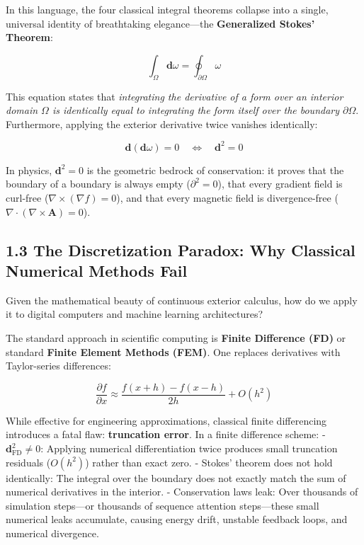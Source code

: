 \documentclass[11pt,twoside,openright]{amsbook}
\begin{document}
In this language, the four classical integral theorems collapse into a single, universal identity of breathtaking elegance—the \textbf{Generalized Stokes' Theorem}:

$$\int_\Omega \mathbf{d}\omega = \oint_{\partial \Omega} \omega$$

This equation states that \textit{integrating the derivative of a form over an interior domain $\Omega$ is identically equal to integrating the form itself over the boundary $\partial \Omega$}. Furthermore, applying the exterior derivative twice vanishes identically:

$$\mathbf{d}(\mathbf{d}\omega) = 0 \quad \iff \quad \mathbf{d}^2 = 0$$

In physics, $\mathbf{d}^2 = 0$ is the geometric bedrock of conservation: it proves that the boundary of a boundary is always empty ($\partial^2 = 0$), that every gradient field is curl-free ($\nabla \times (\nabla f) = 0$), and that every magnetic field is divergence-free ($\nabla \cdot (\nabla \times \mathbf{A}) = 0$).

\subsection{1.3 The Discretization Paradox: Why Classical Numerical Methods Fail}

Given the mathematical beauty of continuous exterior calculus, how do we apply it to digital computers and machine learning architectures? 

The standard approach in scientific computing is \textbf{Finite Difference (FD)} or standard \textbf{Finite Element Methods (FEM)}. One replaces derivatives with Taylor-series differences:

$$\frac{\partial f}{\partial x} \approx \frac{f(x + h) - f(x - h)}{2h} + O(h^2)$$

While effective for engineering approximations, classical finite differencing introduces a fatal flaw: \textbf{truncation error}. 
In a finite difference scheme:
- $\mathbf{d}_{\text{FD}}^2 \neq 0$: Applying numerical differentiation twice produces small truncation residuals ($O(h^2)$) rather than exact zero.
- Stokes' theorem does not hold identically: The integral over the boundary does not exactly match the sum of numerical derivatives in the interior.
- Conservation laws leak: Over thousands of simulation steps—or thousands of sequence attention steps—these small numerical leaks accumulate, causing energy drift, unstable feedback loops, and numerical divergence.
\end{document}
